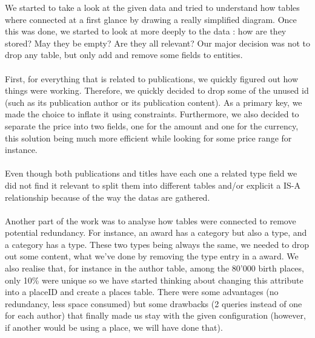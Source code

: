 \documentclass[doubleside, titlepage]{article}
\begin{document}
We started to take a look at the given data and tried to understand how tables where connected at a first glance by drawing a really simplified diagram. Once this was done, we started to look at more deeply to the data : how are they stored? May they be empty? Are they all relevant? Our major decision was not to drop any table, but only add and remove some fields to entities.
~\\~\\
First, for everything that is related to publications, we quickly figured out how things were working. Therefore, we quickly decided to drop some of the unused id (such as its publication author or its publication content). As a primary key, we made the choice to inflate it using constraints. Furthermore, we also decided to separate the price into two fields, one for the amount and one for the currency, this solution being much more efficient while looking for some price range for instance.
~\\~\\
Even though both publications and titles have each one a related type field we did not find it relevant to split them into different tables and/or explicit a IS-A relationship because of the way the datas are gathered.
~\\~\\
Another part of the work was to analyse how tables were connected to remove potential redundancy. For instance, an award has a category but also a type, and a category has a type. These two types being always the same, we needed to drop out some content, what we've done by removing the type entry in a award. We also realise that, for instance in the author table, among the 80'000 birth places, only 10\% were unique so we have started thinking about changing this attribute into a placeID and create a places table. There were some advantages (no redundancy, less space consumed) but some drawbacks (2 queries instead of one for each author) that finally made us stay with the given configuration (however, if another would be using a place, we will have done that).
~\\~\\
\end{document}

